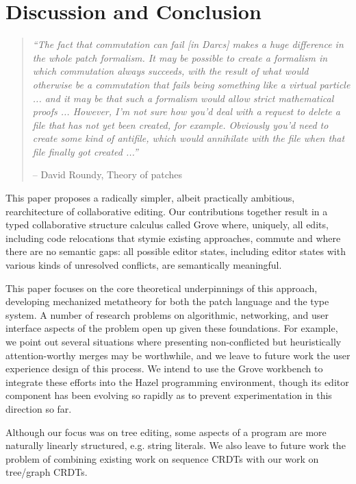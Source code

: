 
\section{Discussion and Conclusion}%
\label{sec:Discussion and Conclusion}
\begin{quote}
    \textit{``The fact that commutation can fail [in Darcs] makes a huge difference in the whole patch formalism. It may be possible to create a formalism in which commutation always succeeds, with the result of what would otherwise be a commutation that fails being something like a virtual particle ... and it may be that such a formalism would allow strict mathematical proofs ... However, I’m not sure how you’d deal with a request to delete a file that has not yet been created, for example. Obviously you’d need to create some kind of antifile, which would annihilate with the file when that file finally got created ...''} 
    
    -- David Roundy, Theory of patches~\cite{old-darcs-manual}
\end{quote}



This paper proposes a radically simpler, albeit practically ambitious, rearchitecture of collaborative editing. Our contributions together result in a typed collaborative structure calculus called Grove 
where, uniquely, all edits, including code relocations that stymie existing approaches, commute and where there are no semantic gaps: all possible editor states, including editor states with various kinds of unresolved conflicts, are semantically meaningful. 

This paper focuses on the core theoretical underpinnings of this approach,
developing mechanized metatheory for both the patch language and the type system. 
A number of research problems on algorithmic, networking, and user interface aspects of the problem open up given these foundations. For example, we point out several situations where presenting non-conflicted but heuristically attention-worthy merges may be worthwhile, and we leave to future work the user experience design of this process. We intend to use the Grove workbench to integrate these efforts into the Hazel programming environment, though its editor component has been evolving so rapidly as to prevent experimentation in this direction so far.

Although our focus was on tree editing, some aspects of a program are more naturally linearly structured, e.g. string literals. We also leave to future work the problem of combining existing work on sequence CRDTs with our work on tree/graph CRDTs.

